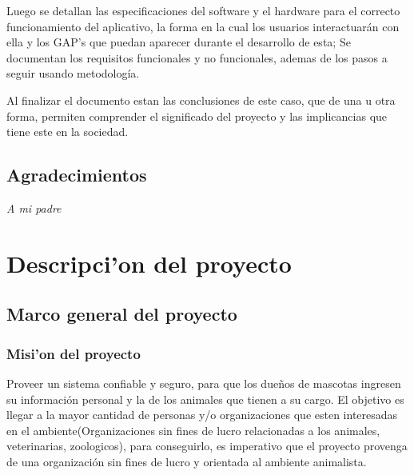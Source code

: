 \documentclass[letterpaper,openright,10pt,oneside]{report}
\begin{document}
	Luego se detallan las especificaciones del software y el hardware para el correcto funcionamiento del aplicativo, la forma en la cual los usuarios interactuarán con ella y los GAP's que puedan aparecer durante el desarrollo de esta; Se documentan los requisitos funcionales y no funcionales, ademas de los pasos a seguir usando metodología.
	
	Al finalizar el documento estan las conclusiones de este caso, que de una u otra forma, permiten comprender el significado del proyecto y las implicancias que tiene este en la sociedad.
	\chapter*{Agradecimientos}
\begin{flushright}
\textit{A mi padre}
\end{flushright}

\tableofcontents



\part{Descripci'on del proyecto}
	\chapter{Marco general del proyecto}
		\section{Misi'on del proyecto}
		
	Proveer un sistema confiable y seguro, para que los dueños de mascotas ingresen su información personal y la de los animales que tienen a su cargo. El objetivo es llegar a la mayor cantidad de personas y/o organizaciones que esten interesadas en el ambiente(Organizaciones sin fines de lucro relacionadas a los animales, veterinarias, zoologicos), para conseguirlo, es imperativo que el proyecto provenga de una organización sin fines de lucro y orientada al ambiente animalista.
		
\end{document}
